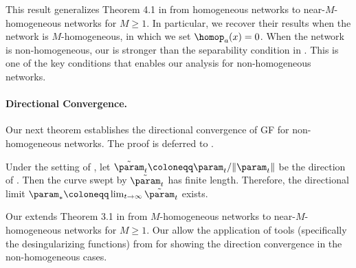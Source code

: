 This result generalizes Theorem 4.1 in \citet{lyu2020gradient} from homogeneous networks to near-$M$-homogeneous networks for $M\ge 1$.
In particular, we recover their results when the network is $M$-homogeneous, in which we set $\homop_a(x) = 0$. When the network is non-homogeneous, our  is stronger than the separability condition in \citet{lyu2020gradient}. This is one of the key conditions that enables our analysis for non-homogeneous networks.



\paragraph{Directional Convergence.}
Our next theorem establishes the directional convergence of GF for non-homogeneous networks. The proof is deferred to .

\begin{theorem}
\label{thm: directional convergence}
Under the setting of , let $\tilde{\param}_t \coloneqq \param_t / \|\param_t\|$ be the direction of  . Then the curve swept by $\tilde{\param}_t$ has finite length. Therefore, 
the directional limit $\param_* \coloneqq \lim_{t\to \infty} \tilde{\param}_t$ exists.
\end{theorem}


Our  extends Theorem 3.1 in \citet{ji2020directional} from $M$-homogeneous networks to near-$M$-homogeneous networks for $M\ge 1$. 
Our  allow the application of 
tools (specifically the desingularizing functions) from \citet{ji2020directional} for showing the direction convergence in the non-homogeneous cases. 

